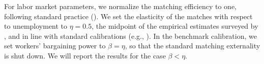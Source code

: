 \documentclass[12pt]{article} %
\theoremstyle{definition}
\begin{document}
For labor market parameters, we normalize the  matching efficiency to one, following standard practice (\citealt{mortensen1994job, petrongolo2001looking}).  We set the elasticity of the matches with respect to unemployment to $\eta = 0.5$, the midpoint of the empirical estimates surveyed by \citet{petrongolo2001looking}, and in line with standard calibrations (e.g., \citealt{hallmilgrom2008, menzio2016directed}).  In the benchmark calibration, we set  workers' bargaining power to $\beta=\eta$, so that the standard matching externality is shut down. We will report the results for the case $\beta<\eta$.  





\end{document}
